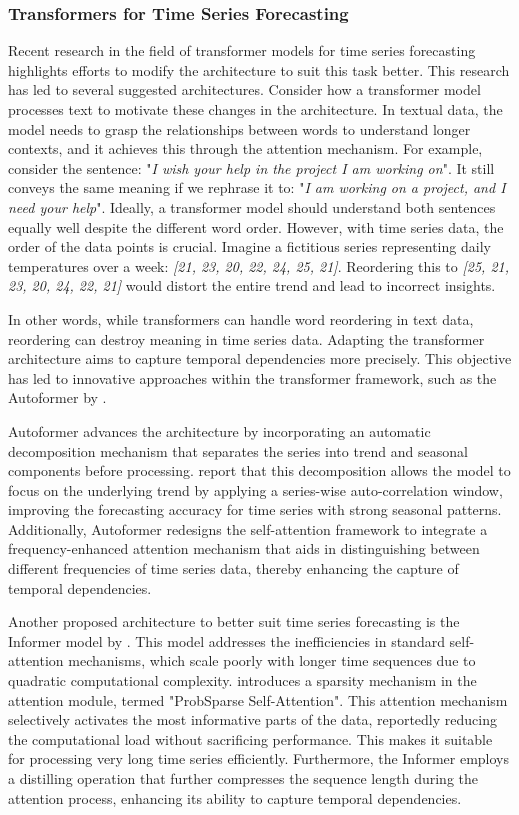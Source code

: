\documentclass[12pt,a4paper]{article}
\begin{document}
\subsubsection{Transformers for Time Series Forecasting}

Recent research in the field of transformer models for time series forecasting highlights efforts to modify the architecture to suit this task better. This research has led to several suggested architectures. Consider how a transformer model processes text to motivate these changes in the architecture. In textual data, the model needs to grasp the relationships between words to understand longer contexts, and it achieves this through the attention mechanism. For example, consider the sentence: "\textit{I wish your help in the project I am working on}". It still conveys the same meaning if we rephrase it to: "\textit{I am working on a project, and I need your help}". Ideally, a transformer model should understand both sentences equally well despite the different word order. However, with time series data, the order of the data points is crucial. Imagine a fictitious series representing daily temperatures over a week: \textit{[21, 23, 20, 22, 24, 25, 21]}. Reordering this to \textit{[25, 21, 23, 20, 24, 22, 21]} would distort the entire trend and lead to incorrect insights.

In other words, while transformers can handle word reordering in text data, reordering can destroy meaning in time series data. Adapting the transformer architecture aims to capture temporal dependencies more precisely. This objective has led to innovative approaches within the transformer framework, such as the Autoformer by \cite{wu2021autoformer}.

Autoformer advances the architecture by incorporating an automatic decomposition mechanism that separates the series into trend and seasonal components before processing. \cite{wu2021autoformer} report that this decomposition allows the model to focus on the underlying trend by applying a series-wise auto-correlation window, improving the forecasting accuracy for time series with strong seasonal patterns. Additionally, Autoformer redesigns the self-attention framework to integrate a frequency-enhanced attention mechanism that aids in distinguishing between different frequencies of time series data, thereby enhancing the capture of temporal dependencies.

Another proposed architecture to better suit time series forecasting is the Informer model by \cite{Zhou2020}. This model addresses the inefficiencies in standard self-attention mechanisms, which scale poorly with longer time sequences due to quadratic computational complexity. \cite{Zhou2020} introduces a sparsity mechanism in the attention module, termed "ProbSparse Self-Attention". This attention mechanism selectively activates the most informative parts of the data, reportedly reducing the computational load without sacrificing performance. This makes it suitable for processing very long time series efficiently. Furthermore, the Informer employs a distilling operation that further compresses the sequence length during the attention process, enhancing its ability to capture temporal dependencies.
\end{document}
